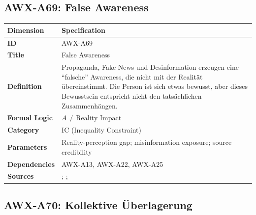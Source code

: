 
\subsection{AWX-A69: False Awareness}

\begin{table}[htbp]
\small
\begin{tabular}{p{3cm}p{11cm}}
\toprule
\textbf{Dimension} & \textbf{Specification} \\
\midrule
\textbf{ID} & AWX-A69 \\
\textbf{Title} & False Awareness \\
\textbf{Definition} & Propaganda, Fake News und Desinformation erzeugen eine ``falsche'' Awareness, die nicht mit der Realität übereinstimmt. Die Person ist sich etwas bewusst, aber dieses Bewusstsein entspricht nicht den tatsächlichen Zusammenhängen. \\
\textbf{Formal Logic} & $A \neq \text{Reality\_Impact}$ \\
\textbf{Category} & IC (Inequality Constraint) \\
\textbf{Parameters} & Reality-perception gap; misinformation exposure; source credibility \\
\textbf{Dependencies} & AWX-A13, AWX-A22, AWX-A25 \\
\textbf{Sources} & \citet{pennycook2021psychology}; \citet{vosoughi2018spread}; \citet{lazer2018science} \\
\bottomrule
\end{tabular}
\end{table}


\subsection{AWX-A70: Kollektive Überlagerung}


